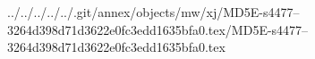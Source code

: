 ../../../../../.git/annex/objects/mw/xj/MD5E-s4477--3264d398d71d3622e0fc3edd1635bfa0.tex/MD5E-s4477--3264d398d71d3622e0fc3edd1635bfa0.tex